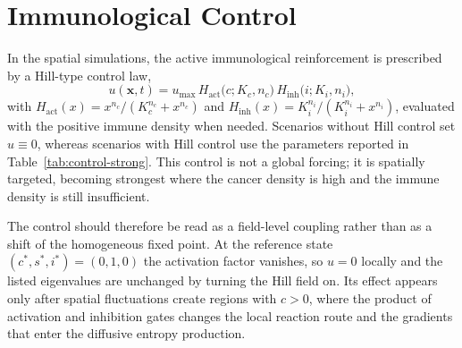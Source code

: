 \section{Immunological Control}\label{sec:control}

In the spatial simulations, the active immunological reinforcement is prescribed by a Hill-type control law,
\begin{equation}\label{eq:u-hill}
u(\mathbf{x},t)=u_{\max}\,H_{\mathrm{act}}\!\bigl(c;K_c,n_c\bigr)\,H_{\mathrm{inh}}\!\bigl(i;K_i,n_i\bigr),
\end{equation}
with $H_{\mathrm{act}}(x)=x^{n_c}/(K_c^{n_c}+x^{n_c})$ and $H_{\mathrm{inh}}(x)=K_i^{n_i}/(K_i^{n_i}+x^{n_i})$, evaluated with the positive immune density when needed. Scenarios without Hill control set $u\equiv 0$, whereas scenarios with Hill control use the parameters reported in Table~\ref{tab:control-strong}. This control is not a global forcing; it is spatially targeted, becoming strongest where the cancer density is high and the immune density is still insufficient.

The control should therefore be read as a field-level coupling rather than as a shift of the homogeneous fixed point. At the reference state $(c^*,s^*,i^*)=(0,1,0)$ the activation factor vanishes, so $u=0$ locally and the listed eigenvalues are unchanged by turning the Hill field on. Its effect appears only after spatial fluctuations create regions with $c>0$, where the product of activation and inhibition gates changes the local reaction route and the gradients that enter the diffusive entropy production.

